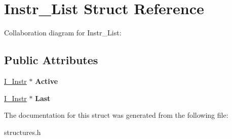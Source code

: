 \hypertarget{structInstr__List}{}\section{Instr\+\_\+\+List Struct Reference}
\label{structInstr__List}


Collaboration diagram for Instr\+\_\+\+List\+:
\subsection*{Public Attributes}
\begin{DoxyCompactItemize}
\item 
\hyperlink{structI__Instr}{I\+\_\+\+Instr} $\ast$ {\bfseries Active}\hypertarget{structInstr__List_a109cd3d8dae66153ee9e91a415cda762}{}\label{structInstr__List_a109cd3d8dae66153ee9e91a415cda762}

\item 
\hyperlink{structI__Instr}{I\+\_\+\+Instr} $\ast$ {\bfseries Last}\hypertarget{structInstr__List_a886c68322614174f896fb9c9349ef33a}{}\label{structInstr__List_a886c68322614174f896fb9c9349ef33a}

\end{DoxyCompactItemize}


The documentation for this struct was generated from the following file\+:\begin{DoxyCompactItemize}
\item 
structures.\+h\end{DoxyCompactItemize}
